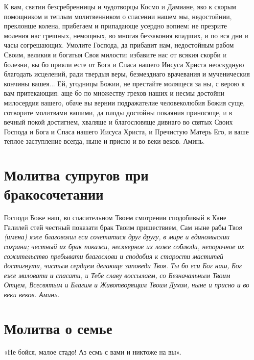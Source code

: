 К вам, святии безсребренницы и чудотворцы Космо и Дамиане, яко к скорым помощником и теплым молитвенником о спасении нашем мы, недостойнии, преклонше колена, прибегаем и припадающе усердно вопием: не презрите моления нас грешных, немощных, во многая беззакония впадших, и по вся дни и часы согрешающих. Умолите Господа, да прибавит нам, недостойным рабом Своим, великия и богатыя Своя милости: избавите нас от всякия скорби и болезни, вы бо прияли есте от Бога и Спаса нашего Иисуса Христа неоскудную благодать исцелений, ради твердыя веры, безмезднаго врачевания и мученическия кончины вашея... Ей, угодницы Божии, не престайте молящеся за ны, с верою к вам притекающия: аще бо по множеству грехов наших и несмы достойни милосердия вашего, обаче вы вернии подражателие человеколюбия Божия суще, сотворите молитвами вашими, да плоды достойны покаяния приносяще, и в вечный покой достигнем, хваляще и благословяще дивнаго во святых Своих Господа и Бога и Спаса нашего Иисуса Христа, и Пречистую Матерь Его, и ваше теплое заступление всегда, ныне и присно и во веки веков. Аминь. 

 



\section{Молитва супругов при бракосочетании}
 


Господи Боже наш, во спасительном Твоем смотрении сподобивый в Кане Галилей стей честный показати брак Твоим пришествием, Сам ныне рабы Тво\itshape я (имен\normalfont{}а) яже благоволил еси сочетатися друг другу, в мире и единомыслии сохрани; честный их брак покажи, нескверное их ложе соблюди, непорочное их сожительство пребывати благослови и сподобия к старости маститей достигнути, чистым сердцем делающе заповеди Твоя. Ты бо еси Бог наш, Бог еже миловати и спасати, и Тебе славу воссылаем, со Безначальным Твоим Отцем, Всесвятым и Благим и Животворящим Твоим Духом, ныне и присно и во веки веков. Аминь. 





\section{Молитва о семье}
 


«Не бойся, малое стадо! Аз есмь с вами и никтоже на вы».


